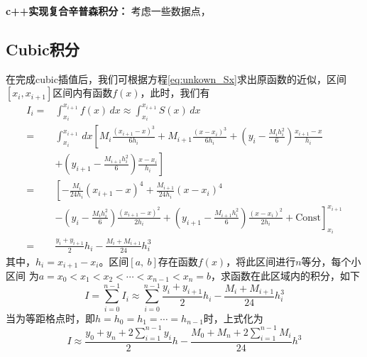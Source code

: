 \begin{example}
	\textbf{c++实现复合辛普森积分：} 考虑一些数据点，
	
\end{example}

\subsection{Cubic积分}
在完成cubic插值后，我们可根据方程\eqref{eq:unkown_Sx}求出原函数的近似，区间$[x_i, x_{i+1}]$区间内有函数$f(x)$，此时，我们有
\begin{equation}
	\begin{aligned}
		I_i =& \int_{x_i}^{x_{i+1}} f(x) \, dx \approx \int_{x_i}^{x_{i+1}} S(x) \, dx \\
		=& \int_{x_i}^{x_{i+1}} \, dx \left[ M_i \frac{\left(x_{i+1}-x\right)^3}{6 h_i}+M_{i+1} \frac{\left(x-x_i\right)^3}{6 h_i}+\left(y_i-\frac{M_i h_i^2}{6}\right) \frac{x_{i+1}-x}{h_i} \right. \\
		 &\left. + \left(y_{i+1}-\frac{M_{i+1} h_i^2}{6}\right) \frac{x-x_i}{h_i} \right]	\\
		=& \left[ -\frac{M_i}{24h_i} \left(x_{i+1}-x\right)^4 + \frac{M_{i+1}}{24h_i}\left(x-x_i\right)^4 \right. \\
		 &\left. -\left(y_i-\frac{M_i h_i^2}{6}\right) \frac{(x_{i+1}-x)^2}{2h_i} + \left(y_{i+1}-\frac{M_{i+1} h_i^2}{6}\right) \frac{(x-x_i)^2}{2h_i} + \text{Const} \right]_{x_i}^{x_{i+1}}	\\
		=& \frac{y_i + y_{i+1}}{2} h_i - \frac{M_{i} + M_{i+1}}{24} h_i^3
	\end{aligned}
\end{equation} 
其中，$h_i = x_{i+1}-x_{i}$。区间$[a,\ b]$存在函数$f(x)$，将此区间进行$n$等分，每个小区间
为$a = x_0 < x_1 < x_2 < \cdots < x_{n-1} < x_n = b $，求函数在此区域内的积分，如下
\begin{equation}
	I = \sum_{i=0}^{n-1} I_{i} \approx \sum_{i=0}^{n-1} \frac{y_i + y_{i+1}}{2} h_i - \frac{M_{i} + M_{i+1}}{24} h_i^3
\end{equation} 
当为等距格点时，即$h = h_0 = h_1 =\cdots = h_{n-1}$时，上式化为
\begin{equation}
	I\approx\frac{y_0+y_n+2\sum_{i=1}^{n-1}y_i}{2}h-\frac{M_0+M_n+2\sum_{i=1}^{n-1}M_i}{24}h^3
    \label{eq:cubic-int-equidistant}
\end{equation} 

